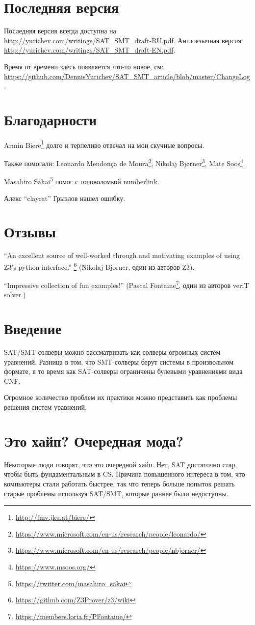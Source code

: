 \section{Последняя версия}

Последняя версия всегда доступна на \url{http://yurichev.com/writings/SAT_SMT_draft-RU.pdf}.
Англоязычная версия: \url{http://yurichev.com/writings/SAT_SMT_draft-EN.pdf}.

Время от времени здесь появляется что-то новое, см: \url{https://github.com/DennisYurichev/SAT_SMT_article/blob/master/ChangeLog}.

\section{Благодарности}

Armin Biere\footnote{\url{http://fmv.jku.at/biere/}} долго и терпеливо отвечал на мои скучные вопросы.

Также помогали:
Leonardo Mendonça de Moura\footnote{\url{https://www.microsoft.com/en-us/research/people/leonardo/}},
Nikolaj Bjørner\footnote{\url{https://www.microsoft.com/en-us/research/people/nbjorner/}},
Mate Soos\footnote{\url{https://www.msoos.org/}}.

Masahiro Sakai\footnote{\url{https://twitter.com/masahiro_sakai}} помог с головоломкой numberlink.

Алекс ``clayrat'' Грызлов нашел ошибку.

\section{Отзывы}

``An excellent source of well-worked through and motivating examples of using Z3's python interface.''
\footnote{\url{https://github.com/Z3Prover/z3/wiki}}
(Nikolaj Bjorner, один из авторов Z3).

``Impressive collection of fun examples!''
(Pascal Fontaine\footnote{\url{https://members.loria.fr/PFontaine/}}, один из авторов veriT solver.)

\section{Введение}

\ac{SAT}/\ac{SMT} солверы можно рассматривать как солверы огромных систем уравнений.
Разница в том, что \ac{SMT}-солверы берут системы в произвольном формате,
в то время как \ac{SAT}-солверы ограничены булевыми уравнениями вида \ac{CNF}.

Огромное количество проблем их практики можно представить как проблемы решения систем уравнений.

\section{Это хайп? Очередная мода?}

Некоторые люди говорят, что это очередной хайп.
Нет, \ac{SAT} достаточно стар, чтобы быть фундаментальным в \ac{CS}.
Причина повышенного интереса в том, что компьютеры стали работать быстрее,
так что теперь больше попыток решать старые проблемы используя 
\ac{SAT}/\ac{SMT}, которые раннее были недоступны.

